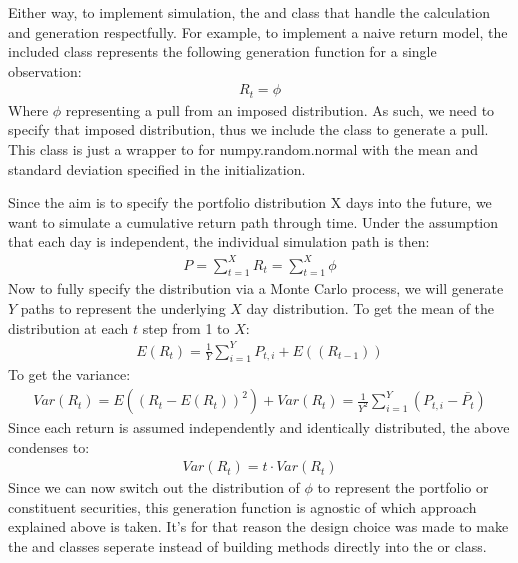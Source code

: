 \documentclass[letterpaper,10pt,english]{sphinxmanual}
\begin{document}
\sphinxAtStartPar
Either way, to implement simulation, the  and
 class that handle the calculation and generation
respectfully. For example, to implement a naive return model, the
included  class represents the following generation
function for a single observation:
\begin{equation*}
\begin{split}R_{t} = \phi\end{split}
\end{equation*}
\sphinxAtStartPar
Where \(\phi\) representing a pull from an imposed distribution. As
such, we need to specify that imposed distribution, thus we include the
 class to generate a pull. This class
is just a wrapper to for numpy.random.normal with the mean and standard
deviation specified in the initialization.

\sphinxAtStartPar
Since the aim is to specify the portfolio distribution X days into the
future, we want to simulate a cumulative return path through time. Under
the assumption that each day is independent, the individual simulation
path is then:
\begin{equation*}
\begin{split}P = \sum_{t=1}^{X} R_{t} = \sum_{t=1}^{X} \phi\end{split}
\end{equation*}
\sphinxAtStartPar
Now to fully specify the distribution via a Monte Carlo process, we will
generate \(Y\) paths to represent the underlying \(X\) day
distribution. To get the mean of the distribution at each \(t\) step
from 1 to \(X\):
\begin{equation*}
\begin{split}E(R_{t}) = \frac{1}{Y} \sum_{i=1}^{Y} P_{t, i} + E((R_{t-1}))\end{split}
\end{equation*}
\sphinxAtStartPar
To get the variance:
\begin{equation*}
\begin{split}Var(R_{t}) = E\left(\left(R_{t} - E(R_{t})\right)^{2}\right) + Var(R_{t}) = \frac{1}{Y^{2}} \sum_{i=1}^{Y}\left(P_{t,i} - \bar{P_{t}} \right)\end{split}
\end{equation*}
\sphinxAtStartPar
Since each return is assumed independently and identically distributed,
the above condenses to:
\begin{equation*}
\begin{split}Var(R_{t}) = t \cdot Var(R_{t})\end{split}
\end{equation*}
\sphinxAtStartPar
Since we can now switch out the distribution of \(\phi\) to
represent the portfolio or constituent securities, this generation
function is agnostic of which approach explained above is taken. It’s
for that reason the design choice was made to make the 
and  classes seperate instead of building methods
directly into the  or  class.
\end{document}

